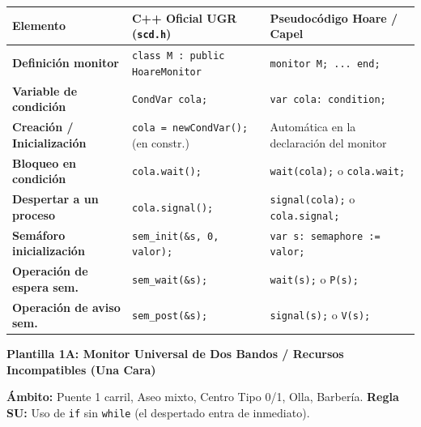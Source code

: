 \documentclass[11pt,a4paper]{article}
\begin{document}
\begin{tcolorbox}[colback=scdLightOrange,colframe=scdOrange,title=\textbf{Equivalencia Inmediata: Sintaxis C++ UGR $\longleftrightarrow$ Pseudocódigo Hoare Canónico},arc=3pt]
\footnotesize
\centering
\renewcommand{\arraystretch}{1.15}
\begin{tabular}{p{4.2cm}p{4.5cm}p{6.8cm}}
\toprule
\textbf{Elemento} & \textbf{C++ Oficial UGR (\texttt{scd.h})} & \textbf{Pseudocódigo Hoare / Capel} \\
\midrule
\textbf{Definición monitor} & \texttt{class M : public HoareMonitor} & \texttt{monitor M; ... end;} \\
\textbf{Variable de condición} & \texttt{CondVar cola;} & \texttt{var cola: condition;} \\
\textbf{Creación / Inicialización} & \texttt{cola = newCondVar();} (en constr.) & Automática en la declaración del monitor \\
\textbf{Bloqueo en condición} & \texttt{cola.wait();} & \texttt{wait(cola);} o \texttt{cola.wait;} \\
\textbf{Despertar a un proceso} & \texttt{cola.signal();} & \texttt{signal(cola);} o \texttt{cola.signal;} \\
\textbf{Semáforo inicialización} & \texttt{sem\_init(\&s, 0, valor);} & \texttt{var s: semaphore := valor;} \\
\textbf{Operación de espera sem.} & \texttt{sem\_wait(\&s);} & \texttt{wait(s);} o \texttt{P(s);} \\
\textbf{Operación de aviso sem.} & \texttt{sem\_post(\&s);} & \texttt{signal(s);} o \texttt{V(s);} \\
\bottomrule
\end{tabular}
\end{tcolorbox}

\clearpage

\begin{tcolorbox}[colback=scdPrimary,colframe=scdPrimary,arc=3pt,left=6pt,right=6pt,top=3pt,bottom=3pt]
    \centering\bfseries\color{white}\normalsize Plantilla 1A: Monitor Universal de Dos Bandos / Recursos Incompatibles (Una Cara)
\end{tcolorbox}
\vspace{-0.15cm}
{\scriptsize \textbf{Ámbito:} Puente 1 carril, Aseo mixto, Centro Tipo 0/1, Olla, Barbería. \textbf{Regla SU:} Uso de \texttt{if} sin \texttt{while} (el despertado entra de inmediato).}
\end{document}

